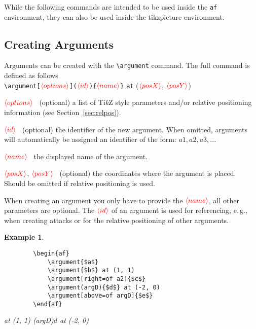 \documentclass{article}
\newcommand{\tikzname}{Ti\emph{k}Z\xspace}
\newcommand{\opt}[2][red]{\ensuremath{\textcolor{#1}{\langle #2\rangle}}}
\newtheorem{example}{Example}
\begin{document}
While the following commands are intended to be used inside the \texttt{af} environment, they can also be used inside the \textsf{tikzpicture} environment.

\subsection{Creating Arguments}
    Arguments can be created with the \verb|\argument| command.
    The full command is defined as follows\\
    
    \noindent
    \verb|\argument[|\opt{options}\verb|](|\opt{id}\verb|){|\opt{name}\verb|}| \verb|at| (\opt{posX}, \opt{posY})

    \begin{list}{}{\leftmargin=\parindent\rightmargin=0pt}
        \item\opt{options}~ (optional) a list of \tikzname style parameters and/or relative positioning information (see Section~\ref{sec:relpos}).
        \item\opt{id}~ (optional) the identifier of the new argument. When omitted, arguments will automatically be assigned an identifier of the form: $a1, a2, a3,...$
        \item\opt{name}~ the displayed name of the argument.
        \item\opt{posX}, \opt{posY}~ (optional) the coordinates where the argument is placed. Should be omitted if relative positioning is used.
        
        \item When creating an argument you only have to provide the \opt{name}, all other parameters are optional.
        The \opt{id} of an argument is used for referencing, e.\,g., when creating attacks or for the relative positioning of other arguments.
    \end{list}

\newpage
\begin{example}~
    \begin{verbatim}
        \begin{af}
            \argument{$a$}
            \argument{$b$} at (1, 1)
            \argument[right=of a2]{$c$}
            \argument(argD){$d$} at (-2, 0)
            \argument[above=of argD]{$e$}
        \end{af}
    \end{verbatim}

    \begin{center}
        \begin{af}
             at (1, 1)
            \argument(argD){$d$} at (-2, 0)
        \end{af}
    \end{center}
\end{example}
\end{document}

